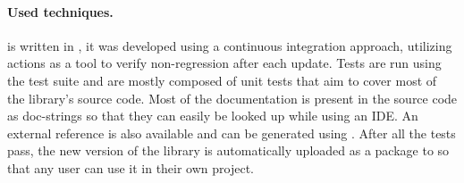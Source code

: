 \paragraph*{Used techniques.}
\pyvmt{} is written in \python{}, it was developed using a continuous integration approach, utilizing \github{} actions as a tool to verify non-regression after each update.
Tests are run using the \pytest{} test suite and are mostly composed of unit tests that aim to cover most of the library's source code.
Most of the documentation is present in the source code as doc-strings so that they can easily be looked up while using an IDE. An external reference is also available and can be generated using \sphinx{} \cite{sphinx}.
After all the tests pass, the new version of the library is automatically uploaded as a package to \pypi{} so that any user can use it in their own project.


